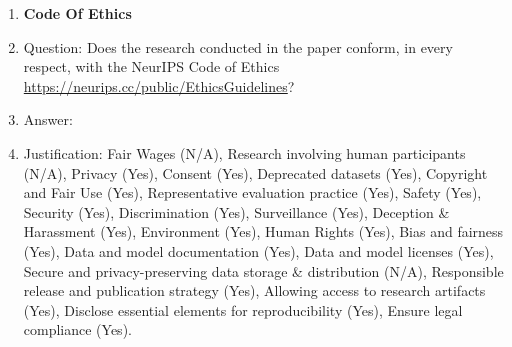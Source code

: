 \begin{enumerate}
\item {\bf Code Of Ethics}
    \item[] Question: Does the research conducted in the paper conform, in every respect, with the NeurIPS Code of Ethics \url{https://neurips.cc/public/EthicsGuidelines}?
    \item[] Answer: \answerYes{} 
    \item[] Justification: Fair Wages (N/A), Research involving human participants (N/A), Privacy (Yes), Consent (Yes), Deprecated datasets (Yes), Copyright and Fair Use (Yes), Representative evaluation practice (Yes), Safety (Yes), Security (Yes), Discrimination (Yes), Surveillance (Yes), Deception \& Harassment (Yes), Environment (Yes), Human Rights (Yes), Bias and fairness (Yes), Data and model documentation (Yes), Data and model licenses (Yes), Secure and privacy-preserving data storage \& distribution (N/A), Responsible release and publication strategy (Yes), Allowing access to research artifacts (Yes), Disclose essential elements for reproducibility (Yes), Ensure legal compliance (Yes).



\end{enumerate}
